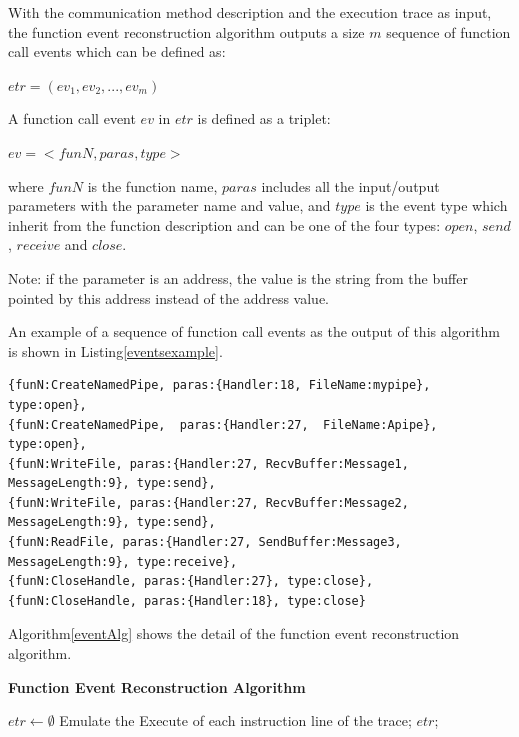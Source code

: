 With the communication method description and the execution trace as input, the function event reconstruction algorithm outputs a size $m$ sequence of function call events which can be defined as:

$etr = (ev_1, ev_2, ..., ev_m)$

A function call event $ev$ in $etr$ is defined as a triplet:

$ev = <funN, paras, type>$

where $funN$ is the function name, $paras$ includes all the input/output parameters with the parameter name and value, and $type$ is the event type which inherit from the function description and can be one of the four types: $open$, $send$, $receive$ and $close$.

Note: if the parameter is an address, the value is the string from the buffer pointed by this address instead of the address value.

An example of a sequence of function call events as the output of this algorithm is shown in Listing\ref{eventsexample}.

\begin{lstlisting}[caption= Example of  $etr$, label=eventsexample]
{funN:CreateNamedPipe, paras:{Handler:18, FileName:mypipe}, type:open},
{funN:CreateNamedPipe,  paras:{Handler:27,  FileName:Apipe}, type:open},
{funN:WriteFile, paras:{Handler:27, RecvBuffer:Message1, MessageLength:9}, type:send},
{funN:WriteFile, paras:{Handler:27, RecvBuffer:Message2, MessageLength:9}, type:send},
{funN:ReadFile, paras:{Handler:27, SendBuffer:Message3, MessageLength:9}, type:receive},
{funN:CloseHandle, paras:{Handler:27}, type:close},
{funN:CloseHandle, paras:{Handler:18}, type:close}
\end{lstlisting}


Algorithm\ref{eventAlg} shows the detail of the function event reconstruction algorithm.
\begin{algorithm}[H]
\DontPrintSemicolon
\caption{{\bf Function Event Reconstruction Algorithm} \label{eventAlg}}
$etr \leftarrow \emptyset$\; 
Emulate the Execute of each instruction line of the trace;\;
\KwRet $etr$;\;
\end{algorithm} 

